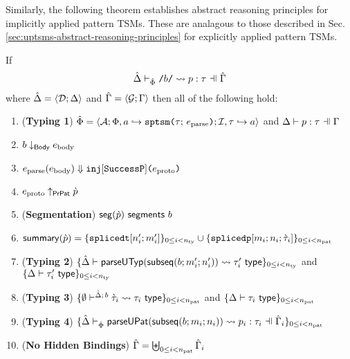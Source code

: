 Similarly, the following theorem establishes abstract reasoning principles for implicitly applied pattern TSMs. These are analagous to those described in Sec. \ref{sec:uptsms-abstract-reasoning-principles} for explicitly applied pattern TSMs.

\begingroup
\def\thetheorem{\ref{thm:spTSM-Typing-Segmentation-Implicit-B}}
\begin{theorem}
If \[\patExpands{\upctx}{\uPhi}{\lit{b}}{p}{\tau}\] where $\hat{\Delta}=\langle \mathcal{D}; \Delta \rangle$ and $\hat{\Gamma}=\langle \mathcal{G}; \Gamma \rangle$ then all of the following hold:
\begin{enumerate}
        \item (\textbf{Typing 1}) $\hat\Phi = \langle \mathcal{A}; \Phi, a \hookrightarrow \texttt{sptsm}\texttt{(}\tau;\,e_\text{parse}\texttt{)}; \mathcal{I}, \tau \hookrightarrow a \rangle$ and $\patType{\pctx}{p}{\tau}$
        \item $b \downarrow_\mathsf{Body} e_\text{body}$
        \item $e_\text{parse}(e_\text{body}) \Downarrow \texttt{inj}[\mathtt{SuccessP}]\texttt{(}e_\text{proto}\texttt{)}$
        \item $e_\text{proto} \uparrow_\mathsf{PrPat} \grave{p}$
        \item (\textbf{Segmentation}) $\mathsf{seg}(\grave{p})~\mathsf{segments}~b$
        \item $\mathsf{summary}(\grave{p}) = \{\texttt{splicedt}[n'_i; m'_i]\}_{0 \leq i < n_\text{ty}} \cup \{\texttt{splicedp}[m_i; n_i; \grave{\tau}_i]\}_{0 \leq i < n_\text{pat}}$
        \item (\textbf{Typing 2}) $\{
              \hat{\Delta} \vdash 
                \mathsf{parseUTyp}(\mathsf{subseq}(b; m'_i; n'_i))
               \leadsto \tau'_i~\mathsf{type}
            \}_{0 \leq i < n_\text{ty}}$ and $\{\Delta \vdash \tau'_i~\mathsf{type}\}_{0 \leq i < n_\text{ty}}$
        \item (\textbf{Typing 3}) $\{
          \emptyset\vdash^{
            \hat{\Delta};\,b
          } 
            \grave{\tau}_i
           \leadsto \tau_i~\mathsf{type}
        \}_{0 \leq i < n_\text{pat}}$ and $\{\Delta \vdash \tau_i~\mathsf{type}\}_{0 \leq i < n_\text{pat}}$
        \item (\textbf{Typing 4}) $\sseq{
          \patExpands
            {\upctx_i}
            {\uPhi}
            {\parseUPatF{\bsubseq{b}{m_i}{n_i}}}
            {p_i}
            {\tau_i}
        }{\npat}$ 
      \item (\textbf{No Hidden Bindings}) $\hat\Gamma = \biguplus_{0 \leq i < n_\text{pat}} \hat\Gamma_i$
\end{enumerate}
\end{theorem}
\endgroup


